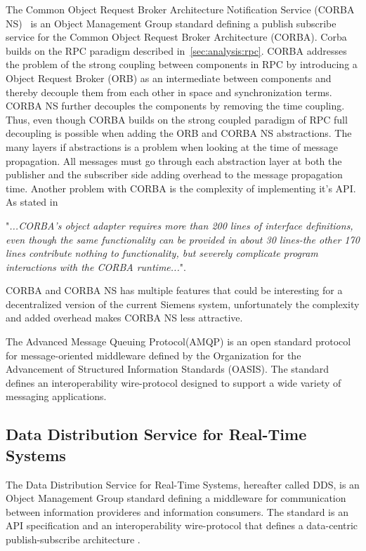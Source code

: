 The Common Object Request Broker Architecture Notification Service (CORBA NS)~\cite{corbanotificationservicespecification} is an Object Management Group standard defining a publish subscribe service for the Common Object Request Broker Architecture (CORBA). Corba builds on the RPC paradigm described in~\cref{sec:analysis:rpc}. CORBA addresses the problem of the strong coupling between components in RPC by introducing a Object Request Broker (ORB) as an intermediate between components and thereby decouple them from each other in space and synchronization terms. CORBA NS further decouples the components by removing the time coupling. Thus, even though CORBA builds on the strong coupled paradigm of RPC full decoupling is possible when adding the ORB and CORBA NS abstractions. The many layers if abstractions is a problem when looking at the time of message propagation. All messages must go through each abstraction layer at both the publisher and the subscriber side adding overhead to the message propagation time. Another problem with CORBA is the complexity of implementing it's API. As stated in ~\cite{Henning:2006:RFC:1142031.1142044}

"\textit{...CORBA's object adapter requires more than 200 lines of interface definitions, even though the same functionality can be provided in about 30 lines-the other 170 lines contribute nothing to functionality, but severely complicate program interactions with the CORBA runtime...}".

CORBA and CORBA NS has multiple features that could be interesting for a decentralized version of the current Siemens system, unfortunately the complexity and added overhead makes CORBA NS less attractive.

The Advanced Message Queuing Protocol(AMQP) is an open standard protocol for message-oriented middleware defined by the Organization for the Advancement of Structured Information Standards (OASIS). The standard defines an interoperability wire-protocol designed to support a wide variety of messaging applications.

\subsection{Data Distribution Service for Real-Time Systems}
The Data Distribution Service for Real-Time Systems, hereafter called DDS, is an Object Management Group standard defining a middleware for communication between information provideres and information consumers.
The standard is an API specification and an interoperability wire-protocol that defines a data-centric publish-subscribe architecture \cite{pardo2003omg}.


